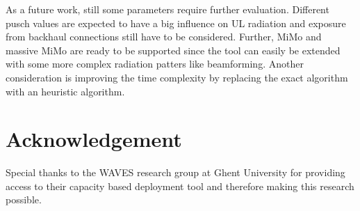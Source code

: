 \documentclass[twocolumn]{phdsymp} %
\begin{document}
As a future work, still some parameters require further evaluation. Different \gls{pusch} values
are expected to have a big influence on \gls{UL} radiation and exposure from 
backhaul connections still have to be considered. Further, MiMo and massive MiMo are ready to be supported since 
the tool can easily be extended with some more complex radiation patters 
like  beamforming. Another consideration is improving the time complexity by 
replacing the exact algorithm with an heuristic algorithm. 
 
\section*{Acknowledgement}
Special thanks to the WAVES research group at Ghent University for providing 
access to their capacity based deployment tool and therefore making this research possible.



\end{document}
